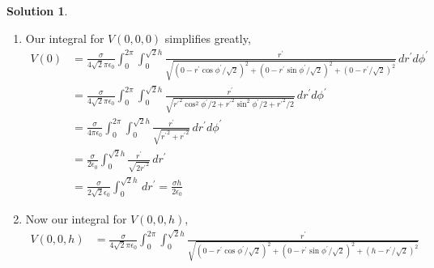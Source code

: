 \documentclass[10pt]{article}
\theoremstyle{definition}
\newtheorem{soln}{Solution}
\newcommand{\primed}[1]{{#1^\prime}}
\begin{document}
\begin{soln}
\begin{enumerate}[label=(\alph*)]
          \begin{enumerate}[label=(\roman*)]
            \item Our integral for $V(0,0,0)$ simplifies greatly,
                  \begin{align*}
                    V(0) & =\frac{\sigma}{4\sqrt{2}\pi\epsilon_0}
                    \int_{0}^{2\pi}\int_{0}^{\sqrt{2}h}
                    \frac{\primed{r}}{\sqrt{\left(0-\primed{r}\cos\primed{\phi}/\sqrt{2}\right)^2
                        +\left(0-\primed{r}\sin\primed{\phi}/\sqrt{2}\right)^2
                        +\left(0-\primed{r}/\sqrt{2}\right)^2
                      }}
                    \,d\primed{r}d\primed{\phi}                   \\
                         & =\frac{\sigma}{4\sqrt{2}\pi\epsilon_0}
                    \int_{0}^{2\pi}\int_{0}^{\sqrt{2}h}
                    \frac{\primed{r}}{\sqrt{
                    {\primed{r}}^2\cos^2\primed{\phi}/2
                    +{\primed{r}}^2\sin^2\primed{\phi}/2
                    +{\primed{r}}^2/2
                    }}
                    \,d\primed{r}d\primed{\phi}                   \\
                         & =\frac{\sigma}{4\pi\epsilon_0}
                    \int_{0}^{2\pi}\int_{0}^{\sqrt{2}h}
                    \frac{\primed{r}}{\sqrt{
                    {\primed{r}}^2
                    +{\primed{r}}^2
                    }}
                    \,d\primed{r}d\primed{\phi}                   \\
                         & =\frac{\sigma}{2\epsilon_0}
                    \int_{0}^{\sqrt{2}h}
                    \frac{\primed{r}}{\sqrt{
                        2{\primed{r}}^2
                      }}
                    \,d\primed{r}                                 \\
                         & =\frac{\sigma}{2\sqrt{2}\epsilon_0}
                    \int_{0}^{\sqrt{2}h}
                    \,d\primed{r}=\frac{\sigma h}{2\epsilon_0}
                  \end{align*}
            \item Now our integral for $V(0,0,h)$,
                  \begin{align*}
                    V(0,0,h) & =\frac{\sigma}{4\sqrt{2}\pi\epsilon_0}
                    \int_{0}^{2\pi}\int_{0}^{\sqrt{2}h}
                    \frac{\primed{r}}{\sqrt{\left(0-\primed{r}\cos\primed{\phi}/\sqrt{2}\right)^2
                        +\left(0-\primed{r}\sin\primed{\phi}/\sqrt{2}\right)^2
                        +\left(h-\primed{r}/\sqrt{2}\right)^2
}}
\end{align*}
\end{enumerate}
\end{enumerate}
\end{soln}
\end{document}
